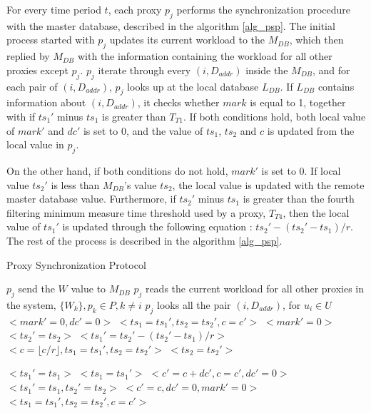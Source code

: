 \documentclass[sigplan,screen]{acmart}
\begin{document}
For every time period $t$, each proxy $p_j$ performs the synchronization procedure with the master database, described in the algorithm \ref{alg_psp}. The initial process started with $p_j$ updates its current workload to the $M_{DB}$, which then replied by $M_{DB}$ with the information containing the workload for all other proxies except $p_j$. $p_j$ iterate through every $(i, D_{addr})$ inside the $M_{DB}$, and for each pair of $(i, D_{addr})$, $p_j$ looks up at the local database $L_{DB}$. If $L_{DB}$ contains information about $(i, D_{addr})$, it checks whether $mark$ is equal to 1, together with if $ts_1'$ minus $ts_1$ is greater than $T_{T1}$. If both conditions hold, both local value of $mark'$ and $dc'$ is set to 0, and the value of $ts_1$, $ts_2$ and $c$ is updated from the local value in $p_j$.

On the other hand, if both conditions do not hold, $mark'$ is set to 0. If local value $ts_2'$ is less than $M_{DB}$'s value $ts_2$, the local value is updated with the remote master database value. Furthermore, if $ts_2'$ minus $ts_1$ is greater than the fourth filtering minimum measure time threshold used by a proxy, $T_{T4}$, then the local value of $ts_1'$ is updated through the following equation : $ts_2'-(ts_2'-ts_1)/r$. The rest of the process is described in the algorithm \ref{alg_psp}. 

\begin{algorithm}
\caption{Proxy Synchronization Protocol}
\label{alg_psp}
\begin{algorithmic}[1]
\State $p_j$ send the $W$ value to $M_{DB}$
\State $p_j$ reads the current workload for all other proxies in the system, $\{W_k\}, p_k \in P, k \neq i$
\State $p_j$ looks all the pair $(i, D_{addr})$, for $u_i \in U$
			\State $<mark' = 0, dc' = 0>$
			\State $<ts_1=ts_1', ts_2=ts_2', c=c'>$
		\Else
			\State $<mark' = 0>$
				\State $<ts_2'=ts_2>$
				\State $<ts_1'=ts_2'-(ts_2'-ts_1)/r>$
				\State $<c = \lfloor c/r \rfloor, ts_1=ts_1', ts_2=ts_2'>$
			\Else
				\State $<ts_2=ts_2'>$
			\EndIf
			
				\State $<ts_1'=ts_1>$
				\State $<ts_1=ts_1'>$
			\EndIf
			\State $<c'=c+dc', c=c', dc'=0>$
		\EndIf
	\Else
		\State $<ts_1'=ts_1, ts_2'=ts_2>$
		\State $<c'=c, dc'= 0, mark'=0>$
	\EndIf
\EndFor
{}
		\State $<ts_1=ts_1', ts_2=ts_2', c=c'>$
	\EndIf
\EndFor
\end{algorithmic}
\end{algorithm}
\end{document}

